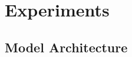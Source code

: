 \documentclass{article}
\begin{document}






\section{Experiments}
\label{sec:experiments}
\subsection{Model Architecture}
\end{document}
